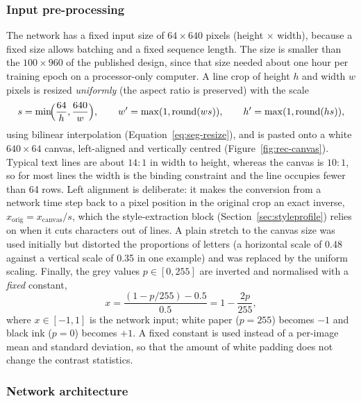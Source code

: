 \subsubsection{Input pre-processing}

The network has a fixed input size of $64\times640$ pixels (height $\times$ width), because a fixed size allows batching and a fixed sequence length.
The size is smaller than the $100\times960$ of the published design, since that size needed about one hour per training epoch on a processor-only computer.
A line crop of height $h$ and width $w$ pixels is resized \emph{uniformly} (the aspect ratio is preserved) with the scale
\begin{equation}
s=\min\!\Bigl(\frac{64}{h},\frac{640}{w}\Bigr),\qquad w'=\max(1,\mathrm{round}(ws)),\qquad h'=\max(1,\mathrm{round}(hs)),
\label{eq:rec-resize}
\end{equation}
using bilinear interpolation (Equation~\ref{eq:seg-resize}), and is pasted onto a white $640\times64$ canvas, left-aligned and vertically centred (Figure~\ref{fig:rec-canvas}).
Typical text lines are about $14{:}1$ in width to height, whereas the canvas is $10{:}1$, so for most lines the width is the binding constraint and the line occupies fewer than 64 rows.
Left alignment is deliberate: it makes the conversion from a network time step back to a pixel position in the original crop an exact inverse, $x_{\mathrm{orig}}=x_{\mathrm{canvas}}/s$, which the style-extraction block (Section~\ref{sec:styleprofile}) relies on when it cuts characters out of lines.
A plain stretch to the canvas size was used initially but distorted the proportions of letters (a horizontal scale of 0.48 against a vertical scale of 0.35 in one example) and was replaced by the uniform scaling.
Finally, the grey values $p\in[0,255]$ are inverted and normalised with a \emph{fixed} constant,
\begin{equation}
x=\frac{(1-p/255)-0.5}{0.5}=1-\frac{2p}{255},
\label{eq:rec-norm}
\end{equation}
where $x\in[-1,1]$ is the network input; white paper ($p=255$) becomes $-1$ and black ink ($p=0$) becomes $+1$.
A fixed constant is used instead of a per-image mean and standard deviation, so that the amount of white padding does not change the contrast statistics.


\subsubsection{Network architecture}

